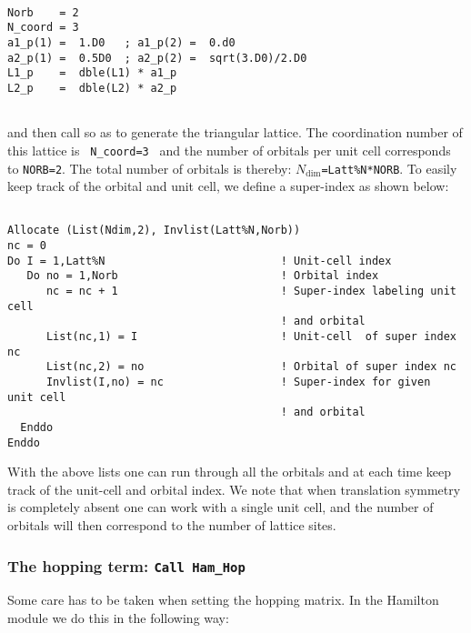 \documentclass{SciPost}
\begin{document}
\begin{lstlisting}

Norb    = 2
N_coord = 3
a1_p(1) =  1.D0   ; a1_p(2) =  0.d0
a2_p(1) =  0.5D0  ; a2_p(2) =  sqrt(3.D0)/2.D0             
L1_p    =  dble(L1) * a1_p
L2_p    =  dble(L2) * a2_p
            
\end{lstlisting}
and then  call  so as to generate the triangular lattice.  The coordination number of this lattice is \texttt{ N\_coord=3 }  and  the number of orbitals per unit cell  corresponds to \texttt{NORB=2}.    The total number of  orbitals  is thereby: \texttt{$N_{\mathrm{dim}}$=Latt\%N*NORB}.    To easily keep track of the orbital and unit cell, we define a  super-index as shown below:


\begin{lstlisting}

Allocate (List(Ndim,2), Invlist(Latt%N,Norb))
nc = 0
Do I = 1,Latt%N                           ! Unit-cell index 
   Do no = 1,Norb                         ! Orbital index
      nc = nc + 1                         ! Super-index labeling unit cell
                                          ! and orbital
      List(nc,1) = I                      ! Unit-cell  of super index  nc
      List(nc,2) = no                     ! Orbital of super index nc
      Invlist(I,no) = nc                  ! Super-index for given  unit cell
                                          ! and orbital
  Enddo
Enddo

\end{lstlisting}

With the above lists one can run through all the orbitals and at each time keep track of the unit-cell and orbital index.    We note that when translation symmetry is completely absent  one can work with a single unit cell, and the  number of orbitals will then correspond to the  number of lattice sites. 
%
\subsubsection{The hopping term:  \texttt{Call Ham\_Hop} }
%
Some care has to be taken when setting the hopping matrix.    In the Hamilton module    we do this in the following way:
\end{document}
